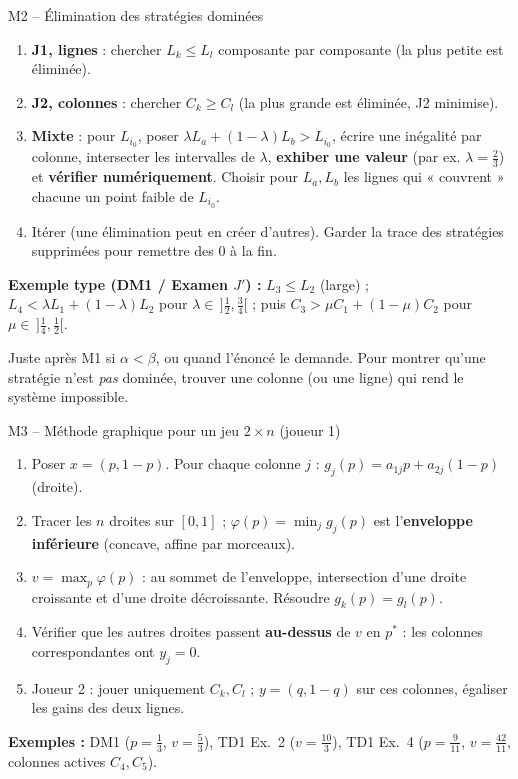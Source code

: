 \documentclass[11pt,a4paper]{article}
\begin{document}
\begin{methbox}{M2 -- Élimination des stratégies dominées}
\begin{enumerate}[leftmargin=*]
\item \textbf{J1, lignes} : chercher $L_k\le L_l$ composante par composante (la plus petite est éliminée).
\item \textbf{J2, colonnes} : chercher $C_k\ge C_l$ (la plus grande est éliminée, J2 minimise).
\item \textbf{Mixte} : pour $L_{i_0}$, poser $\lambda L_a+(1-\lambda)L_b>L_{i_0}$, écrire une inégalité par colonne, intersecter les intervalles de $\lambda$, \textbf{exhiber une valeur} (par ex. $\lambda=\frac23$) et \textbf{vérifier numériquement}. Choisir pour $L_a,L_b$ les lignes qui « couvrent » chacune un point faible de $L_{i_0}$.
\item Itérer (une élimination peut en créer d'autres). Garder la trace des stratégies supprimées pour remettre des 0 à la fin.
\end{enumerate}
\textbf{Exemple type (DM1 / Examen $J'$) :} $L_3\le L_2$ (large) ; $L_4<\lambda L_1+(1-\lambda)L_2$ pour $\lambda\in\,]\frac12,\frac34[$ ; puis $C_3>\mu C_1+(1-\mu)C_2$ pour $\mu\in\,]\frac14,\frac12[$.
\end{methbox}
\begin{whenbox}
Juste après M1 si $\alpha<\beta$, ou quand l'énoncé le demande. Pour montrer qu'une stratégie n'est \emph{pas} dominée, trouver une colonne (ou une ligne) qui rend le système impossible.
\end{whenbox}

\begin{methbox}{M3 -- Méthode graphique pour un jeu $2\times n$ (joueur 1)}
\begin{enumerate}[leftmargin=*]
\item Poser $x=(p,1-p)$. Pour chaque colonne $j$ : $g_j(p)=a_{1j}p+a_{2j}(1-p)$ (droite).
\item Tracer les $n$ droites sur $[0,1]$ ; $\varphi(p)=\min_j g_j(p)$ est l'\textbf{enveloppe inférieure} (concave, affine par morceaux).
\item $v=\max_p\varphi(p)$ : au sommet de l'enveloppe, intersection d'une droite croissante et d'une droite décroissante. Résoudre $g_k(p)=g_l(p)$.
\item Vérifier que les autres droites passent \textbf{au-dessus} de $v$ en $p^*$ : les colonnes correspondantes ont $y_j=0$.
\item Joueur 2 : jouer uniquement $C_k,C_l$ ; $y=(q,1-q)$ sur ces colonnes, égaliser les gains des deux lignes.
\end{enumerate}
\textbf{Exemples :} DM1 ($p=\frac13$, $v=\frac53$), TD1 Ex.~2 ($v=\frac{10}3$), TD1 Ex.~4 ($p=\frac9{11}$, $v=\frac{42}{11}$, colonnes actives $C_4,C_5$).
\end{methbox}
\end{document}

